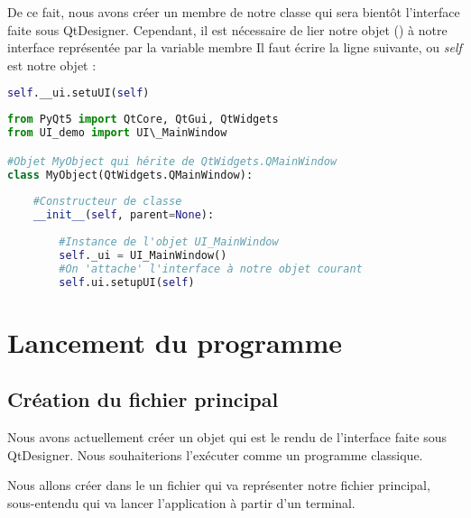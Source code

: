 De ce fait, nous avons créer un membre de notre classe qui sera bientôt l'interface faite sous QtDesigner. \newline
Cependant, il est nécessaire de lier notre objet () à notre interface représentée par la variable membre  \newline
Il faut écrire la ligne suivante, ou \textit{self} est notre objet  : 

\begin{lstlisting}[language=Python]
        self.__ui.setuUI(self)
\end{lstlisting} \newline

\newline




\begin{lstlisting}[language=Python]
from PyQt5 import QtCore, QtGui, QtWidgets
from UI_demo import UI\_MainWindow

#Objet MyObject qui hérite de QtWidgets.QMainWindow
class MyObject(QtWidgets.QMainWindow):
    
    #Constructeur de classe
    __init__(self, parent=None):
        
        #Instance de l'objet UI_MainWindow
        self._ui = UI_MainWindow()
        #On 'attache' l'interface à notre objet courant
        self.ui.setupUI(self)

\end{lstlisting}



\section{Lancement du programme}

\subsection{Création du fichier principal}

Nous avons actuellement créer un objet  qui est le rendu de l'interface faite sous QtDesigner. Nous souhaiterions l'exécuter comme un programme classique. \newline


Nous allons créer dans le  un fichier  qui va représenter notre fichier principal, sous-entendu qui va lancer l'application à partir d'un terminal. \newline

